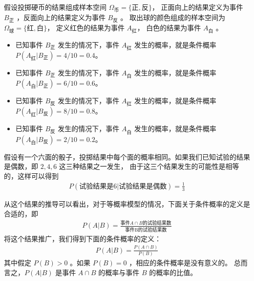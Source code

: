 \documentclass[letterpaper,10pt,english]{sphinxmanual}
\begin{document}
假设投掷硬币的结果组成样本空间 \(\Omega_{\text{币}} = \{\text{正},\text{反}\}\)，
正面向上的结果定义为事件 \(B_{\text{正}}\) ，反面向上的结果定义为事件 \(B_{\text{反}}\) 。
取出球的颜色组成的样本空间为 \(\Omega_{\text{球}} = \{\text{红},\text{白}\}\)，
定义红色的结果为事件 \(A_{\text{红}}\)，
白色的结果为事件 \(A_{\text{白}}\) 。
\begin{itemize}
\item {} 
已知事件 \(B_{\text{正}}\) 发生的情况下，事件 \(A_{\text{红}}\) 发生的概率，就是条件概率
\(P(A_{\text{红}}|B_{\text{正}})=4/10=0.4\)。

\item {} 
已知事件 \(B_{\text{正}}\) 发生的情况下，事件 \(A_{\text{白}}\) 发生的概率，就是条件概率
\(P(A_{\text{白}}|B_{\text{正}})=6/10=0.6\)。

\item {} 
已知事件 \(B_{\text{反}}\) 发生的情况下，事件 \(A_{\text{红}}\) 发生的概率，就是条件概率
\(P(A_{\text{红}}|B_{\text{反}})=8/10=0.8\)。

\item {} 
已知事件 \(B_{\text{反}}\) 发生的情况下，事件 \(A_{\text{白}}\) 发生的概率，就是条件概率
\(P(A_{\text{白}}|B_{\text{反}})=2/10=0.2\)。

\end{itemize}

\begin{sphinxShadowBox}

假设有一个六面的骰子，投掷结果中每个面的概率相同。如果我们已知试验的结果是偶数，即 \(2,4,6\) 这三种结果之一发生，
由于这三个结果发生的可能性是相等的，这样可以得到
\begin{equation}\label{equation:概率基础/content:概率基础/content:5}
\begin{split}P(\text{试验结果是6}|\text{试验结果是偶数}) = \frac{1}{3}\end{split}
\end{equation}\end{sphinxShadowBox}

从这个结果的推导可以看出，对于等概率模型的情况，下面关于条件概率的定义是合适的，即
\begin{equation}\label{equation:概率基础/content:概率基础/content:6}
\begin{split}P(A|B) = \frac{\text{事件}A \cap B\text{的试验结果数}}{\text{事件B的试验结果数}}\end{split}
\end{equation}
将这个结果推广，我们得到下面的条件概率的定义：
\begin{equation}\label{equation:概率基础/content:概率基础/content:7}
\begin{split}P(A|B) = \frac{P(A\cap B)}{P(B)}\end{split}
\end{equation}
其中假定 \(P(B)>0\) 。如果 \(P(B)=0\) ，相应的条件概率是没有意义的。
总而言之，\(P(A|B)\) 是事件 \(A \cap B\) 的概率与事件 \(B\) 的概率的比值。
\end{document}
